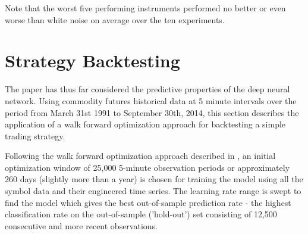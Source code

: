 \documentclass{article}
\begin{document}
\vspace{10pt}
\begin{table}[h]
\centerline{
}
\caption{This table shows the top five instruments for which the sample mean of the classification rate was highest over the ten walk forward experiments. F1-scores are also provided. The mean and standard deviation of the sample mean classification accuracies and F1-scores over the 43 futures are also provided.}
\label{fig:top-five}
\end{table}

\vspace{10pt}
Note that the worst five performing instruments performed no better or even worse than white noise on average over the ten experiments.


\section{Strategy Backtesting} \label{sect:backtesting}

The paper has thus far considered the predictive properties of the deep neural
network. Using commodity futures historical data at 5 minute intervals over the
period from March 31st 1991 to September 30th, 2014, this section describes the
application of a walk forward optimization approach for backtesting a simple
trading strategy.


Following the walk forward optimization approach described in \cite{Tomasini2011}, an initial optimization window of 25,000 5-minute observation periods or approximately 260 days (slightly more than a year) is chosen for training the model using all the symbol data and their engineered time series. The learning rate range is swept to find the model which gives the best out-of-sample
prediction rate - the highest classification rate on the out-of-sample ('hold-out') set consisting of 12,500 consecutive and more recent observations.
\end{document}
